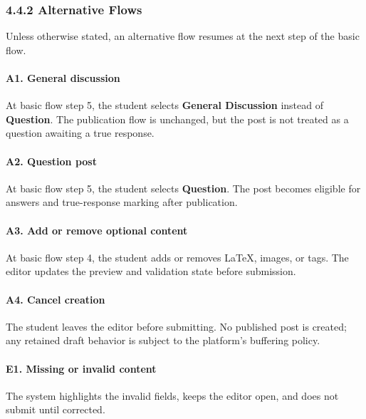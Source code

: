 \documentclass[12pt]{article}
\begin{document}
\subsubsection*{4.4.2 Alternative Flows}
\par\medskip
Unless otherwise stated, an alternative flow resumes at the next step of the basic flow.
\par\medskip
\hypertarget{sec:a1-general-discussion}{}
\paragraph*{A1. General discussion}
\par\medskip
At basic flow step 5, the student selects \textbf{General Discussion} instead of \textbf{Question}. The publication flow is unchanged, but the post is not treated as a question awaiting a true response.
\par\medskip
\hypertarget{sec:a2-question-post}{}
\paragraph*{A2. Question post}
\par\medskip
At basic flow step 5, the student selects \textbf{Question}. The post becomes eligible for answers and true-response marking after publication.
\par\medskip
\hypertarget{sec:a3-add-or-remove-optional-content}{}
\paragraph*{A3. Add or remove optional content}
\par\medskip
At basic flow step 4, the student adds or removes LaTeX, images, or tags. The editor updates the preview and validation state before submission.
\par\medskip
\hypertarget{sec:a4-cancel-creation}{}
\paragraph*{A4. Cancel creation}
\par\medskip
The student leaves the editor before submitting. No published post is created; any retained draft behavior is subject to the platform's buffering policy.
\par\medskip
\hypertarget{sec:e1-missing-or-invalid-content}{}
\paragraph*{E1. Missing or invalid content}
\par\medskip
The system highlights the invalid fields, keeps the editor open, and does not submit until corrected.
\par\medskip
\hypertarget{sec:e2-unsupported-or-oversized-image}{}
\end{document}
